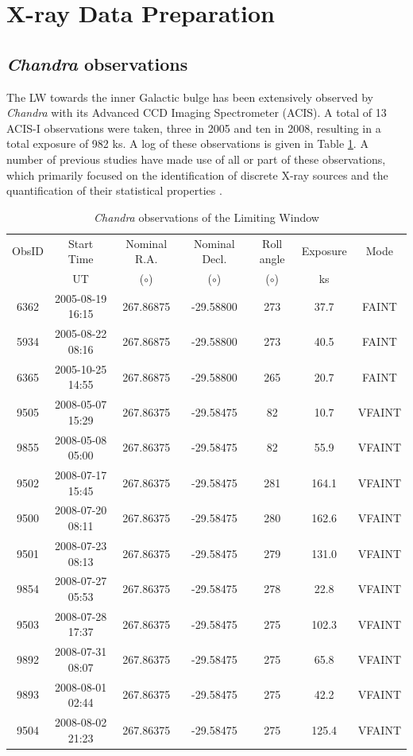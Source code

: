 \documentclass[fleqn,usenatbib]{mnras}
\begin{document}
\section{X-ray Data Preparation} \label{sec:obs}
\subsection{{\it Chandra} observations} \label{subsec:xdata}
The LW towards the inner Galactic bulge has been extensively observed by {\it Chandra} with its Advanced CCD Imaging Spectrometer (ACIS).
A total of 13 ACIS-I observations were taken, three in 2005 and ten in 2008, resulting in a total exposure of 982 ks.
A log of these observations is given in Table \ref{tab:obsinfo}. 
A number of previous studies have made use of all or part of these observations, which primarily focused on the identification of discrete X-ray sources and the quantification of their statistical properties \citep{2009Natur.458.1142R,2009ApJ...700.1702V,2009ApJ...706..223H,2011MNRAS.414..495R,2012MNRAS.427.1633H,2013ApJ...766...14M,2016MNRAS.462L.106W}.

\begin{table}
\centering
\caption{{\it Chandra} observations of the Limiting Window} \label{tab:obsinfo}
\centering
\begin{tabular}{ccccccc}
\hline
\hline
ObsID & Start Time & Nominal R.A. & Nominal Decl. &  Roll angle & Exposure & Mode\\
& UT & ($\circ$) & ($\circ$) & ($\circ$) & ks & \\ 
\hline
6362 & 2005-08-19 16:15 & 267.86875 & -29.58800 & 273 & 37.7 & FAINT \\
5934 & 2005-08-22 08:16 & 267.86875 & -29.58800 & 273 & 40.5 & FAINT \\
6365 & 2005-10-25 14:55 & 267.86875 & -29.58800 & 265 & 20.7 & FAINT \\
9505 & 2008-05-07 15:29 & 267.86375 & -29.58475 & 82  & 10.7 & VFAINT \\
9855 & 2008-05-08 05:00 & 267.86375 & -29.58475 & 82  & 55.9 & VFAINT \\
9502 & 2008-07-17 15:45 & 267.86375 & -29.58475 & 281 & 164.1 & VFAINT \\
9500 & 2008-07-20 08:11 & 267.86375 & -29.58475 & 280 & 162.6 & VFAINT \\
9501 & 2008-07-23 08:13 & 267.86375 & -29.58475 & 279 & 131.0 & VFAINT \\
9854 & 2008-07-27 05:53 & 267.86375 & -29.58475 & 278 & 22.8 & VFAINT \\
9503 & 2008-07-28 17:37 & 267.86375 & -29.58475 & 275 & 102.3 & VFAINT \\
9892 & 2008-07-31 08:07 & 267.86375 & -29.58475 & 275 & 65.8 & VFAINT \\
9893 & 2008-08-01 02:44 & 267.86375 & -29.58475 & 275 & 42.2 & VFAINT \\
9504 & 2008-08-02 21:23 & 267.86375 & -29.58475 & 275 & 125.4 & VFAINT \\
\hline
\end{tabular}
\end{table}
\end{document}

